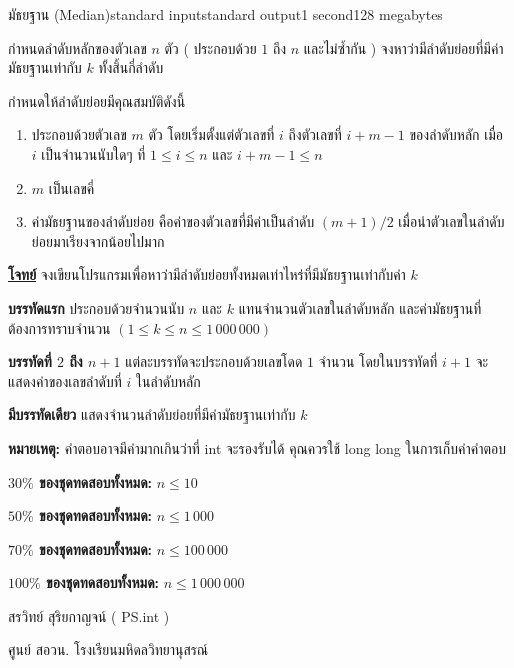 \documentclass[11pt,a4paper]{article}
\begin{document}
\begin{problem}{มัธยฐาน (Median)}{standard input}{standard output}{1 second}{128 megabytes}

 กำหนดลำดับหลักของตัวเลข $n$ ตัว ( ประกอบด้วย $1$ ถึง $n$ และไม่ซ้ำกัน ) จงหาว่ามีลำดับย่อยที่มีค่ามัธยฐานเท่ากับ $k$ ทั้งสิ้นกี่ลำดับ

กำหนดให้ลำดับย่อยมีคุณสมบัติดังนี้
\begin{enumerate}

\item ประกอบด้วยตัวเลข $m$ ตัว โดยเริ่มตั้งแต่ตัวเลขที่ $i$ ถึงตัวเลขที่ $i+m-1$ ของลำดับหลัก เมื่อ $i$ เป็นจำนวนนับใดๆ ที่ $1 \leq i \leq n$ และ $i+m-1 \leq n$
\item $m$ เป็นเลขคี่
\item ค่ามัธยฐานของลำดับย่อย คือค่าของตัวเลขที่มีค่าเป็นลำดับ $(m+1)/2$ เมื่อนำตัวเลขในลำดับย่อยมาเรียงจากน้อยไปมาก
\end{enumerate}

\bigskip
\underline{\textbf{โจทย์}}  จงเขียนโปรแกรมเพื่อหาว่ามีลำดับย่อยทั้งหมดเท่าไหร่ที่มีมัธยฐานเท่ากับค่า $k$


\InputFile

\textbf{บรรทัดแรก} ประกอบด้วยจำนวนนับ $n$ และ $k$ แทนจำนวนตัวเลขในลำดับหลัก และค่ามัธยฐานที่ต้องการทราบจำนวน $( 1 \leq k \leq n \leq 1\,000\,000)$

\textbf{บรรทัดที่ $2$ ถึง $n+1$} แต่ละบรรทัดจะประกอบด้วยเลขโดด $1$ จำนวน โดยในบรรทัดที่ $i+1$ จะแสดงค่าของเลขลำดับที่ $i$ ในลำดับหลัก


\OutputFile

\textbf{มีบรรทัดเดียว} แสดงจำนวนลำดับย่อยที่มีค่ามัธยฐานเท่ากับ $k$
\bigskip

\textbf{หมายเหตุ:} คำตอบอาจมีค่ามากเกินว่าที่ int จะรองรับได้ คุณควรใช้ long long ในการเก็บค่าคำตอบ

\Examples

\begin{example}
%
%
\end{example}

\Scoring

\textbf{$30\%$ ของชุดทดสอบทั้งหมด:} $n \leq 10$

\textbf{$50\%$ ของชุดทดสอบทั้งหมด:} $n \leq 1\,000$

\textbf{$70\%$ ของชุดทดสอบทั้งหมด:} $n \leq 100\,000$
            
\textbf{$100\%$ ของชุดทดสอบทั้งหมด:} $n \leq 1\,000\,000$
            
            
\Source

สรวิทย์  สุริยกาญจน์ ( PS.int )

ศูนย์ สอวน. โรงเรียนมหิดลวิทยานุสรณ์

\end{problem}
\end{document}
